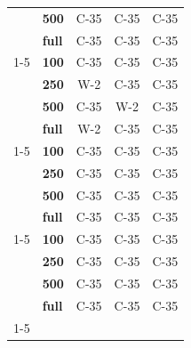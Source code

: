 \begin{table}[t]
\begin{tabular}{llccc}
\textbf{} & \textbf{500} & C-35 & C-35 & C-35 \\
\textbf{} & \textbf{full} & C-35 & C-35 & C-35 \\
\cline{1-5}
\multirow[t]{4}{*}{\textbf{Swahili}} & \textbf{100} & C-35 & C-35 & C-35 \\
\textbf{} & \textbf{250} & W-2 & C-35 & C-35 \\
\textbf{} & \textbf{500} & C-35 & W-2 & C-35 \\
\textbf{} & \textbf{full} & W-2 & C-35 & C-35 \\
\cline{1-5}
\multirow[t]{4}{*}{\textbf{Yoruba}} & \textbf{100} & C-35 & C-35 & C-35 \\
\textbf{} & \textbf{250} & C-35 & C-35 & C-35 \\
\textbf{} & \textbf{500} & C-35 & C-35 & C-35 \\
\textbf{} & \textbf{full} & C-35 & C-35 & C-35 \\
\cline{1-5}
\multirow[t]{4}{*}{\textbf{Amharic}} & \textbf{100} & C-35 & C-35 & C-35 \\
\textbf{} & \textbf{250} & C-35 & C-35 & C-35 \\
\textbf{} & \textbf{500} & C-35 & C-35 & C-35 \\
\textbf{} & \textbf{full} & C-35 & C-35 & C-35 \\
\cline{1-5}
\bottomrule
\end{tabular}
\end{table}
